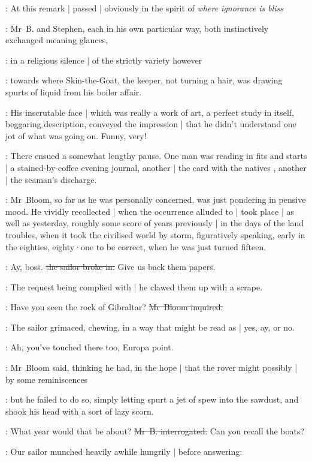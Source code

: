 :
At this remark |
passed |
obviously in the spirit of \emph{where ignorance is bliss}

:
Mr~B. and Stephen,
each in his own particular way,
both instinctively exchanged meaning glances,

:
in a religious silence |
of the strictly  variety however

:
towards where Skin-the-Goat,
 the keeper,
not turning a hair,
was drawing spurts of liquid from his boiler affair.

:
His inscrutable face |
which was really a work of art,
a perfect study in itself,
beggaring description,
conveyed the impression |
that he didn't understand one jot of what was going on.
Funny,
very!%

:
There ensued a somewhat lengthy pause.
One man was reading in fits and starts |
a stained-by-coffee evening journal,
another |
the card with the natives ,
another |
the seaman's discharge.

:
Mr~Bloom,
so far as he was personally concerned,
was just pondering in pensive mood.
He vividly recollected |
when the occurrence alluded to |
took place |
as well as yesterday,
roughly some score of years previously |
in the days of the land troubles,
when it took the civilised world by storm,
figuratively speaking,
early in the eighties,
eighty·one to be correct,
when he was just turned fifteen.

\Murphy:
Ay,
boss.
\sout{the sailor broke in.}
Give us back them papers.

:
The request being complied with |
he clawed them up with a scrape.

\Bloom:
Have you seen the rock of Gibraltar?
\sout{Mr~Bloom inquired.}

:
The sailor grimaced,
chewing,
in a way that might be read as |
yes,
ay,
or no.

\Bloom:
Ah,
you've touched there too,
Europa point.

:
Mr~Bloom said,
thinking he had,
in the hope |
that the rover might possibly |
by some reminiscences

:
but he failed to do so,
simply letting spurt a jet of spew into the sawdust,
and shook his head with a sort of lazy scorn.

\Bloom:
What year would that be about?
\sout{Mr~B. interrogated.}
Can you recall the boats?

:
Our  sailor munched heavily awhile hungrily |
before answering:

